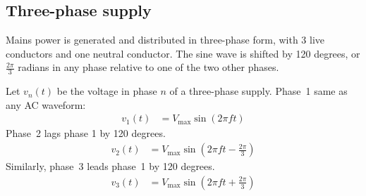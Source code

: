 \documentclass{pgslides}
\begin{document}



\subsection{Three-phase supply}

\begin{frame}{\insertsubsectionhead}
  
Mains power is generated and distributed in three-phase form, with 3 live conductors and one neutral conductor.
The sine wave is shifted by 120 degrees, or $\frac{2\pi}{3}$ radians in any phase relative to one of the two other phases.

\end{frame}


\begin{frame}
Let $v_n(t)$ be the voltage in phase $n$ of a three-phase supply.
Phase~1 same as any AC waveform: 
\begin{align}
  v_1(t) & = V_{\mbox{max}} \sin ( 2 \pi f t )
\end{align}
Phase~2 lags phase 1 by 120 degrees.
\begin{align}
  v_2(t) & = V_{\mbox{max}} \sin \left ( 2 \pi f t - \frac{2\pi}{3} \right ) 
\end{align}
Similarly, phase~3 leads phase~1 by 120 degrees.
\begin{align}
  v_3(t) & = V_{\mbox{max}} \sin \left ( 2 \pi f t + \frac{2\pi}{3} \right )                      
\end{align}
\end{frame}
\end{document}
